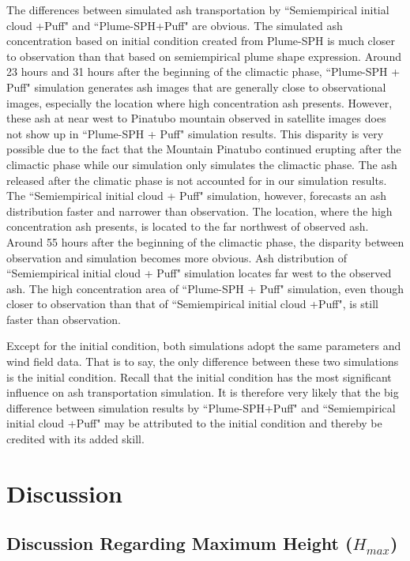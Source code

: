 \documentclass[utf8]{frontiersSCNS} %
\begin{document}
The differences between simulated ash transportation by ``Semiempirical initial cloud +Puff" and ``Plume-SPH+Puff" are obvious. The simulated ash concentration based on initial condition created from Plume-SPH is much closer to observation than that based on semiempirical plume shape expression. Around 23 hours and 31 hours after the beginning of the climactic phase, ``Plume-SPH + Puff" simulation generates ash images that are generally close to observational images, especially the location where high concentration ash presents. However, these ash at near west to Pinatubo mountain observed in satellite images does not show up in ``Plume-SPH + Puff" simulation results. This disparity is very possible due to the fact that the Mountain Pinatubo continued erupting after the climactic phase while our simulation only simulates the climactic phase. The ash released after the climatic phase is not accounted for in our simulation results. The ``Semiempirical initial cloud + Puff" simulation, however, forecasts an ash distribution faster and narrower than observation. The location, where the high concentration ash presents, is located to the far northwest of observed ash.
Around 55 hours after the beginning of the climactic phase, the disparity between observation and simulation becomes more obvious. Ash distribution of ``Semiempirical initial cloud + Puff" simulation locates far west to the observed ash. The high concentration area of ``Plume-SPH + Puff" simulation, even though closer to observation than that of ``Semiempirical initial cloud +Puff", is still faster than observation.

Except for the initial condition, both simulations adopt the same parameters and wind field data. That is to say, the only difference between these two simulations is the initial condition. Recall that the initial condition has the most significant influence on ash transportation simulation. It is therefore very likely that the big difference between simulation results by ``Plume-SPH+Puff" and ``Semiempirical initial cloud +Puff" may be attributed to the initial condition and thereby be credited with its added skill.

\section{Discussion}
\subsection{Discussion Regarding Maximum Height ($H_{max}$)}
\end{document}
